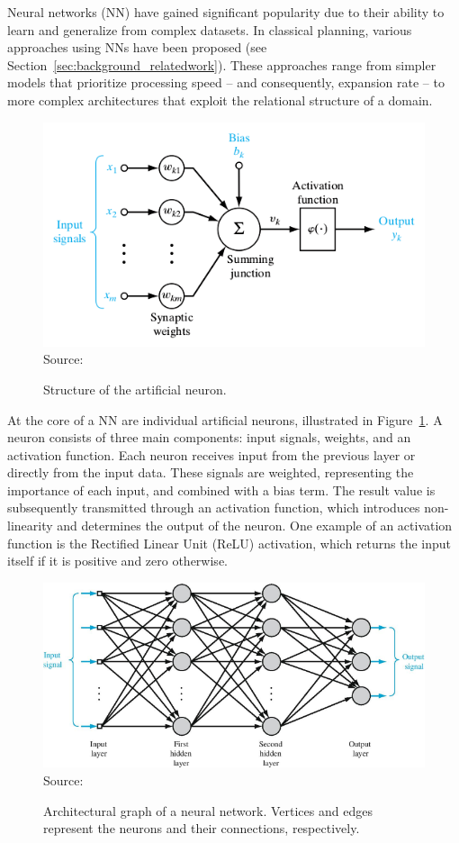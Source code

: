 Neural networks (NN) have gained significant popularity due to their ability to learn and generalize from complex datasets. In classical planning, various approaches using NNs have been proposed (see Section~\ref{sec:background_relatedwork}). These approaches range from simpler models that prioritize processing speed -- and consequently, expansion rate -- to more complex architectures that exploit the relational structure of a domain.

\begin{figure}[ht]
    \caption{Structure of the artificial neuron.}
    \label{fig:neuron}
    \centering
    \includegraphics[width=0.9\linewidth]{figures/neuron.png} \\
    Source:~\cite{Haykin/2009}
\end{figure}

At the core of a NN are individual artificial neurons, illustrated in Figure~\ref{fig:neuron}. A neuron consists of three main components: input signals, weights, and an activation function. Each neuron receives input from the previous layer or directly from the input data. These signals are weighted, representing the importance of each input, and combined with a bias term. The result value is subsequently transmitted through an activation function, which introduces non-linearity and determines the output of the neuron. One example of an activation function is the Rectified Linear Unit (ReLU) activation, which returns the input itself if it is positive and zero otherwise.

\begin{figure}
    \caption[Architectural graph of a neural network.]{Architectural graph of a neural network. Vertices and edges represent the neurons and their connections, respectively.}
    \label{fig:neuralnetwork}
    \addvspace{\baselineskip}
    \centering
    \includegraphics[width=0.9\linewidth]{figures/network.png} \\
    \addvspace{\baselineskip}
    Source:~\cite{Haykin/2009}
\end{figure}

